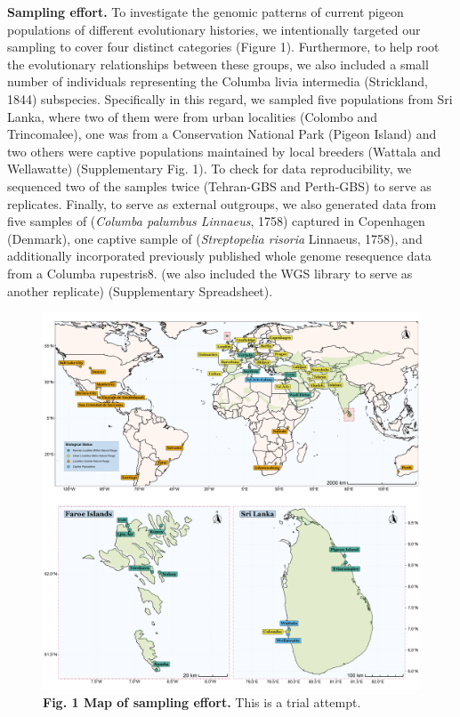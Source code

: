 \documentclass[a4paper]{article}
\begin{document}
\begin{multicols}{2}
\noindent \textbf{Sampling effort.} To investigate the genomic patterns of current pigeon populations of different evolutionary histories, we intentionally targeted our sampling to cover four distinct categories (Figure 1). Furthermore, to help root the evolutionary relationships between these groups, we also included a small number of individuals representing the Columba livia intermedia (Strickland, 1844) subspecies. Specifically in this regard, we sampled five populations from Sri Lanka, where two of them were from urban localities (Colombo and Trincomalee), one was from a Conservation National Park (Pigeon Island) and two others were captive populations maintained by local breeders (Wattala and Wellawatte) (Supplementary Fig. 1). To check for data reproducibility, we sequenced two of the samples twice (Tehran-GBS and Perth-GBS) to serve as replicates. Finally, to serve as external outgroups, we also generated data from five samples of (\textit{Columba palumbus Linnaeus}, 1758) captured in Copenhagen (Denmark), one captive sample of (\textit{Streptopelia risoria} Linnaeus, 1758), and additionally incorporated previously published whole genome resequence data from a Columba rupestris8. (we also included the WGS library to serve as another replicate) (Supplementary Spreadsheet).\
\end{multicols}

\begin{figure}
\centering
\includegraphics[scale=0.35]{../FPGP--Analyses/FPGP--Map/FPGP--Map.pdf}
\caption*{ \scriptsize \textbf{Fig. 1 Map of sampling effort.} This is a trial attempt.}
\label{MainText:FPGP--Map}
\end{figure}
\end{document}
